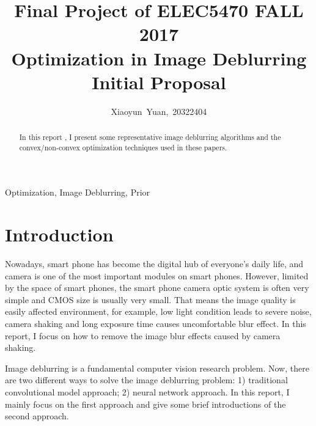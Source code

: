 \documentclass[journal, onecolumn, 10pt]{IEEEtran}
\begin{document}
\title{Final Project of ELEC5470 FALL 2017 \\ Optimization in Image Deblurring \\ Initial Proposal}

\author{Xiaoyun~Yuan,~20322404}


%
{}
\maketitle

\begin{abstract}
In this report , I present some representative image deblurring algorithms and the convex/non-convex optimization techniques used in these papers. 
\end{abstract}

\begin{IEEEkeywords}
Optimization, Image Deblurring, Prior 
\end{IEEEkeywords}

\IEEEpeerreviewmaketitle

\section{Introduction}
Nowadays, smart phone has become the digital hub of everyone's daily life, and camera is one of the most important modules on smart phones. However, limited by the space of smart phones, the smart phone camera optic system is often very simple and CMOS size is usually very small. That means the image quality is easily affected environment, for example, low light condition leads to severe noise, camera shaking and long exposure time causes uncomfortable blur effect. In this report, I focus on how to remove the image blur effects caused by camera shaking.

Image deblurring is a fundamental computer vision research problem. Now, there are two different ways to solve the image deblurring problem: 1) traditional convolutional model approach; 2) neural network approach. In this report, I mainly focus on the first approach and give some brief introductions of the second approach.
\end{document}
